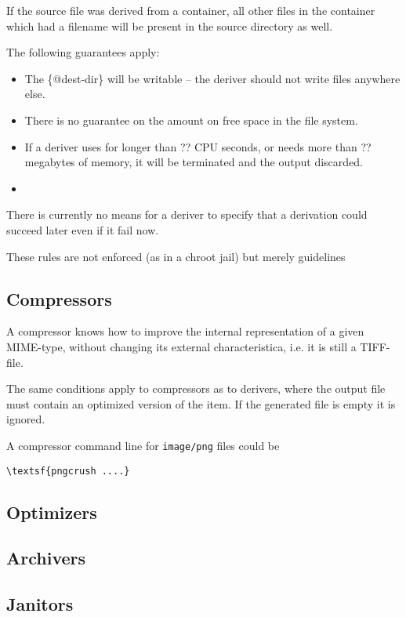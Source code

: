 If the source file was derived from a container, all other files in the container which had a filename will be present in the source directory as well.

The following guarantees apply:

\begin{itemize}
\item The \{@dest-dir\} will be writable -- the deriver should not write files anywhere else.
\item There is no guarantee on the amount on free space in the file system.
\item If a deriver uses for longer than \textsf{??} CPU seconds, or needs more than \textsf{??} megabytes of memory, it  will be terminated and the output discarded.  
\item 
\end{itemize}

There is currently no means for a deriver to specify that a derivation could succeed later even if it fail now.

These rules are not enforced (as in a \textsf{chroot jail}) but merely guidelines 


\subsection{Compressors}

A compressor knows how to improve the internal
representation of a given MIME-type, without changing its
external characteristica, i.e. it is still a TIFF-file.

The same conditions apply to compressors as to derivers,
where the output file must contain an optimized version of
the item.  If the generated file is empty it is ignored.

A compressor command line for \texttt{image/png} files could
be

\begin{verbatim}
\textsf{pngcrush ....}
\end{verbatim}

\subsection{Optimizers}


\subsection{Archivers}


\subsection{Janitors}



